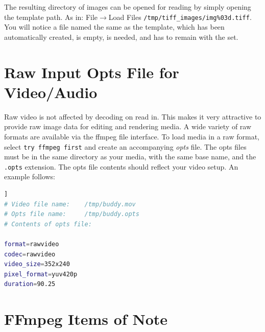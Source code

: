 The resulting directory of images can be opened for reading by simply opening the template path.  As in: File$\rightarrow$Load Files \texttt{/tmp/tiff\_images/img\%03d.tiff}.  You will notice a file named the same as the template, which has been automatically created, is empty, is needed, and has to remain with the set.

\section{Raw Input Opts File for Video/Audio}%
\label{sec:raw_input_opts_video_audio}

Raw video is not affected by decoding on read in.  This makes it very attractive to provide raw image data for editing and rendering media.  A wide variety of raw formats are available via the ffmpeg file interface.  To load media in a raw format, select \texttt{try ffmpeg first} and create an accompanying \textit{opts} file.  The opts files must be in the same directory as your media, with the same base name, and the \texttt{.opts} extension.  The opts file contents should reflect your video setup.  An example follows:

\begin{lstlisting}[language=bash,numbers=none]]
# Video file name:    /tmp/buddy.mov
# Opts file name:     /tmp/buddy.opts
# Contents of opts file:

format=rawvideo
codec=rawvideo
video_size=352x240
pixel_format=yuv420p
duration=90.25
\end{lstlisting}

\section{FFmpeg Items of Note}%
\label{sec:ffmpeg_items_note}

